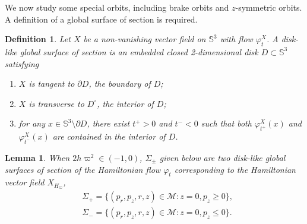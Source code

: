 \documentclass[11pt]{amsart}
\newcommand{\om}{\varpi}
\newtheorem{lemma}{Lemma}[section]
\newtheorem{defi}{Definition}[section]
\begin{document}
We now study some special orbits, including brake orbits and $z$-symmetric orbits. A definition of a global surface of section is required.
\begin{defi}
	Let $X$ be a non-vanishing vector field on $\mathbb{S}^{3}$ with flow $\varphi_{t}^{X}$. A disk-like global surface of section is an embedded closed 2-dimensional disk $D\subset\mathbb{S}^{3}$ satisfying
	\begin{enumerate}
		\item[(1)] $X$ is tangent to $\partial D$, the boundary of $D$;
		\item[(2)] $X$ is transverse to $D^{\circ}$, the interior of $D$;
		\item[(3)] for any $x\in\mathbb{S}^{3}\setminus\partial D$, there exist $t^{+}>0$ and $t^{-}<0$ such that both $\varphi_{t^{+}}^{X}(x)$ and $\varphi_{t^{-}}^{X}(x)$ are contained in the interior of $D$.
	\end{enumerate}
\end{defi} 
\begin{lemma}\label{lemma:global serface of section 1}
	When $2h \om^2 \in (-1, 0)$, $\Sigma_{\pm}$ given below are two disk-like global surfaces of section of the Hamiltonian flow $\varphi_{t}$ corresponding to the Hamiltonian vector field $X_{H_{\om}}$,
	\begin{equation*}
	\begin{aligned}
		&\Sigma_{+}=\{(p_{r},p_{z},r,z)\in\mathcal{M}:z=0,p_{z}\geq0\},\\
		&\Sigma_{-}=\{(p_{r},p_{z},r,z)\in\mathcal{M}:z=0,p_{z}\leq0\}.
	\end{aligned}
\end{equation*}
\end{lemma}
\end{document}

